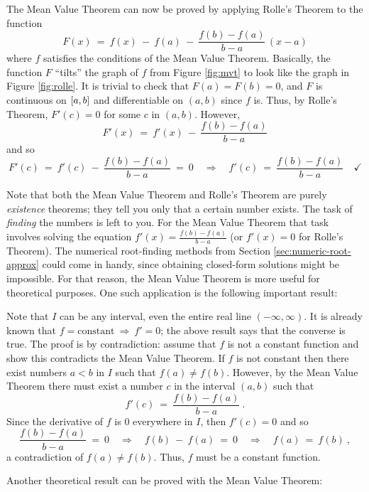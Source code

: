 The Mean Value Theorem can now be proved by applying Rolle's Theorem to the
function
\[
F(x) ~=~ f(x) ~-~ f(a) ~-~ \frac{f(b) - f(a)}{b - a}\,(x - a)
\]
where $f$ satisfies the conditions of the Mean Value Theorem. Basically, the
function $F$
``tilts'' the graph of $f$ from Figure \ref{fig:mvt} to look like the graph in
Figure \ref{fig:rolle}. It is trivial to check that $F(a) = F(b) = 0$, and $F$
is continuous on $\lbrack a,b \rbrack$ and differentiable on $(a,b)$ since $f$ is. Thus,
by Rolle's Theorem, $F'(c) = 0$ for some $c$ in $(a,b)$. However,
\[
F'(x) ~=~ f'(x) ~-~ \frac{f(b) - f(a)}{b - a}
\]
and so
\[
F'(c) ~=~ f'(c) ~-~ \frac{f(b) - f(a)}{b - a} ~=~ 0 \quad\Rightarrow\quad
f'(c) ~=~ \frac{f(b) - f(a)}{b - a} \quad\checkmark
\]

Note that both the Mean Value Theorem and Rolle's Theorem are purely
\emph{existence} theorems; they tell you only that a certain number exists. The
task of \emph{finding} the numbers is left to you.  For the Mean Value Theorem
that task involves solving the equation $f'(x) = \frac{f(b) - f(a)}{b - a}$ (or
$f'(x)=0$ for Rolle's Theorem). The numerical root-finding methods from Section
\ref{sec:numeric-root-approx} could come in handy, since obtaining closed-form solutions might be
impossible. For that reason, the Mean Value Theorem is more useful for
theoretical purposes. One such application is the following important result:
\newpage
{}

\noindent Note that $I$ can be any interval, even the entire
real line $(-\infty,\infty)$. It is already known that $f=\text{constant}
~\Rightarrow~ f'=0$; the above result says that the converse is true.
The proof is by contradiction: assume that $f$ is not a constant function and
show this contradicts the Mean Value Theorem. If $f$ is not constant then there
exist numbers $a < b$ in $I$ such that $f(a) \ne f(b)$. However,
by the Mean Value Theorem there must exist a number $c$ in the interval $(a,b)$
such that
\[
f'(c) ~=~ \frac{f(b) - f(a)}{b - a} ~.
\]
Since the derivative of $f$ is 0 everywhere in $I$, then $f'(c) = 0$ and so
\[
\frac{f(b) - f(a)}{b - a} ~=~ 0 \quad\Rightarrow\quad
f(b) ~-~ f(a) ~=~ 0 \quad\Rightarrow\quad f(a) ~=~ f(b) ~,
\]
a contradiction of $f(a) \ne f(b)$. Thus, $f$ must be a constant function.
\quad\checkmark

Another theoretical result can be proved with the Mean Value Theorem:

